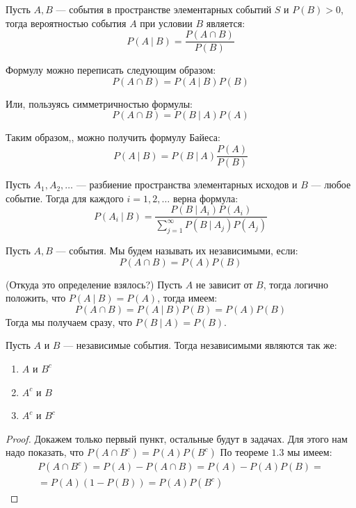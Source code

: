 \documentclass[document]{subfiles}
\begin{document}
\begin{definition}
    Пусть $A, B$ --- события в пространстве элементарных событий $S$ и $P(B) > 0$, тогда вероятностью события $A$ при условии $B$ является:
    \[P(A ~|~ B) = \frac{P(A \cap B)}{P(B)}\]
\end{definition}

Формулу можно переписать следующим образом:
\[P(A \cap B) = P(A~|~B) P(B)\]

Или, пользуясь симметричностью формулы:
\[P(A \cap B) = P(B ~|~ A) P(A)\]

Таким образом,, можно получить формулу Байеса:
\[P(A~|~B) = P(B ~|~ A)\frac{P(A)}{P(B)}\]

\begin{theorem}
    Пусть $A_1, A_2, \dots$ --- разбиение пространства элементарных исходов и $B$ --- любое событие. Тогда для каждого $i = 1,2, \dots$ верна формула:
    \[P(A_i ~|~ B) = \frac{P(B~|~ A_i) P(A_i)}{\sum_{j=1}^\infty P(B ~|~ A_j) P(A_j)}\]
\end{theorem}

\begin{definition}
    Пусть $A,B$ --- события. Мы будем называть их независимыми, если:
    \[P(A \cap B) = P(A)P(B)\]
\end{definition}
\begin{remark}(Откуда это определение взялось?)
    Пусть $A$ не зависит от $B$, тогда логично положить, что $P(A ~|~B) = P(A)$, тогда имеем:
    \[P(A \cap B) = P(A~|~B)P(B) = P(A)P(B)\]
    Тогда мы получаем сразу, что $P(B ~|~ A) = P(B)$.
\end{remark}

\begin{theorem}
    Пусть $A$ и $B$ --- независимые события. Тогда независимыми являются так же:
    \begin{enumerate}
        \item $A$ и $B^c$
        \item $A^c$ и $B$
        \item $A^c$ и $B^c$
    \end{enumerate}
\end{theorem}
\begin{proof}
    Докажем только первый пункт, остальные будут в задачах. Для этого нам надо показать, что $P(A \cap B^c) = P(A)P(B^c)$
    По теореме $1.3$ мы имеем:
    \begin{gather*}
        P(A \cap B^c) = P(A) - P(A \cap B) = P(A) - P(A)P(B) = \\ = P(A)(1 - P(B)) = P(A)P(B^c)
    \end{gather*}
\end{proof}
\end{document}
